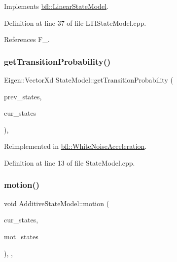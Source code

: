 Implements \mbox{\hyperlink{classbfl_1_1LinearStateModel_a58db2093c6d255b8d41dbf0f0c5c28e5}{bfl\+::\+Linear\+State\+Model}}.



Definition at line 37 of file L\+T\+I\+State\+Model.\+cpp.



References F\+\_\+.

\mbox{\label{classbfl_1_1StateModel_acb582cb7d41ec7b854ed1dbd8965b6fc}} 
\subsubsection{\texorpdfstring{get\+Transition\+Probability()}{getTransitionProbability()}}
{\footnotesize\ttfamily Eigen\+::\+Vector\+Xd State\+Model\+::get\+Transition\+Probability (\begin{DoxyParamCaption}\item[{const Eigen\+::\+Ref$<$ const Eigen\+::\+Matrix\+Xd $>$ \&}]{prev\+\_\+states,  }\item[{Eigen\+::\+Ref$<$ Eigen\+::\+Matrix\+Xd $>$}]{cur\+\_\+states }\end{DoxyParamCaption})\hspace{0.3cm}{\ttfamily [virtual]}, {\ttfamily [inherited]}}



Reimplemented in \mbox{\hyperlink{classbfl_1_1WhiteNoiseAcceleration_a10d81273e59d14f7d7ce794533c122a8}{bfl\+::\+White\+Noise\+Acceleration}}.



Definition at line 13 of file State\+Model.\+cpp.

\mbox{\label{classbfl_1_1AdditiveStateModel_a9f145bf8c592fc0092d84421f26dbb8b}} 
\subsubsection{\texorpdfstring{motion()}{motion()}}
{\footnotesize\ttfamily void Additive\+State\+Model\+::motion (\begin{DoxyParamCaption}\item[{const Eigen\+::\+Ref$<$ const Eigen\+::\+Matrix\+Xd $>$ \&}]{cur\+\_\+states,  }\item[{Eigen\+::\+Ref$<$ Eigen\+::\+Matrix\+Xd $>$}]{mot\+\_\+states }\end{DoxyParamCaption})\hspace{0.3cm}{\ttfamily [override]}, {\ttfamily [virtual]}, {\ttfamily [inherited]}}



